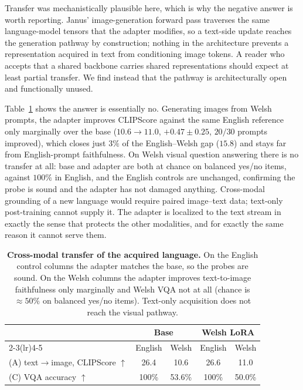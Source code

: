 \documentclass{article}
\begin{document}
Transfer was mechanistically plausible here, which is why the negative answer is
worth reporting. Janus' image-generation forward pass traverses the same
language-model tensors that the adapter modifies, so a text-side update reaches
the generation pathway by construction; nothing in the architecture prevents a
representation acquired in text from conditioning image tokens. A reader who
accepts that a shared backbone carries shared representations should expect at
least partial transfer. We find instead that the pathway is architecturally open
and functionally unused.

Table~\ref{tab:xmodal} shows the answer is essentially no. Generating images
from Welsh prompts, the adapter improves CLIPScore against the same English
reference only marginally over the base ($10.6\to11.0$, $+0.47\pm0.25$, $20/30$
prompts improved), which closes just $3\%$ of the English--Welsh gap ($15.8$)
and stays far from English-prompt faithfulness. On Welsh visual question
answering there is no transfer at all: base and adapter are both at chance on
balanced yes/no items, against $100\%$ in English, and the English controls are
unchanged, confirming the probe is sound and the adapter has not damaged
anything. Cross-modal grounding of a new language would require paired
image--text data; text-only post-training cannot supply it. The adapter is
localized to the text stream in exactly the sense that protects the other
modalities, and for exactly the same reason it cannot serve them.

\begin{table}[t]
\caption{\textbf{Cross-modal transfer of the acquired language.} On the English
control columns the adapter matches the base, so the probes are sound. On the
Welsh columns the adapter improves text-to-image faithfulness only marginally
and Welsh VQA not at all (chance is $\approx50\%$ on balanced yes/no items).
Text-only acquisition does not reach the visual pathway.}
\label{tab:xmodal}
\centering\small
\begin{tabular}{lcccc}
\toprule
& \multicolumn{2}{c}{Base} & \multicolumn{2}{c}{Welsh LoRA} \\
\cmidrule(lr){2-3}\cmidrule(lr){4-5}
& English & Welsh & English & Welsh \\
\midrule
(A) text$\to$image, CLIPScore $\uparrow$ & 26.4 & 10.6 & 26.6 & 11.0 \\
(C) VQA accuracy $\uparrow$              & 100\% & 53.6\% & 100\% & 50.0\% \\
\bottomrule
\end{tabular}
\end{table}
\end{document}
